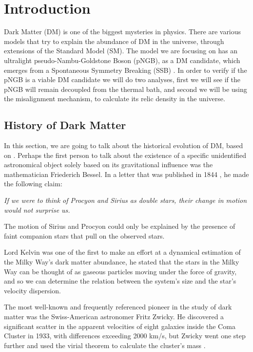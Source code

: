 
\chapter{Introduction}
\label{Chapter:introduction}

Dark Matter (DM) is one of the biggest mysteries in physics. There are various models that try to explain the abundance of DM in the universe, through extensions of the Standard Model (SM)\cite{Heeck_2015}\cite{vipandax}\cite{Dutra_2021}. The model we are focusing on has an ultralight pseudo-Nambu-Goldstone Boson (pNGB), as a DM candidate, which emerges from a Spontaneous Symmetry Breaking (SSB) \cite{Freitas_2021}.
In order to verify if the pNGB is a viable DM candidate we will do two analyses, first we will see if the pNGB will remain decoupled from the thermal bath, and second we will be using the misalignment mechanism, to calculate its relic density in the universe.

\section{History of Dark Matter}
In this section, we are going to talk about the historical evolution of DM, based on \cite{Bertone_2018}.
Perhaps the first person to talk about the existence of a specific unidentified astronomical object solely based on its gravitational influence was the mathematician Friederich Bessel.
In a letter that was published in 1844 \cite{1844bessel}, he made the following claim: 

\textit{If we were to think of Procyon and Sirius as double stars, their change in motion would not surprise us.} 

The motion of Sirius and Procyon could only be explained by the presence of faint companion stars that pull on the observed stars.

Lord Kelvin was one of the first to make an effort at a dynamical estimation of the Milky Way's dark matter abundance, he stated that the stars in the Milky Way can be thought of as gaseous particles moving under the force of gravity, and so we can determine the relation between the system's size and the star's velocity dispersion. 

The most well-known and frequently referenced pioneer in the study of dark matter was the Swiss-American astronomer Fritz Zwicky.
He discovered a significant scatter in the apparent velocities of eight galaxies inside the Coma Cluster in 1933, with differences exceeding 2000 km/s, but Zwicky went one step further and used the virial theorem to calculate the cluster's mass \cite{1933zwicky}.

